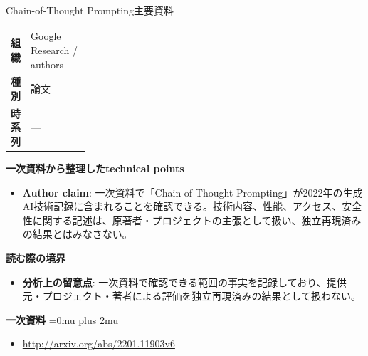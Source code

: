 \begin{technicalnote}{Chain-of-Thought Prompting}{主要資料}
\begingroup
\begin{tabularx}{\linewidth}{@{}>{\bfseries}p{0.22\linewidth}X@{}}
組織 & Google Research / authors \\
種別 & 論文 \\
時系列 & — \\
\end{tabularx}
\smallskip
{\bfseries 一次資料から整理したtechnical points}
\begin{itemize}[leftmargin=1.5em,itemsep=0.35em]
\item \textbf{Author claim}: 一次資料で「Chain-of-Thought Prompting」が2022年の生成AI技術記録に含まれることを確認できる。技術内容、性能、アクセス、安全性に関する記述は、原著者・プロジェクトの主張として扱い、独立再現済みの結果とはみなさない。
\end{itemize}
\begin{minipage}{\linewidth}
{\bfseries 読む際の境界}
\begin{itemize}[leftmargin=1.5em,itemsep=0.35em]
\item \textbf{分析上の留意点}: 一次資料で確認できる範囲の事実を記録しており、提供元・プロジェクト・著者による評価を独立再現済みの結果として扱わない。
\end{itemize}
\begin{samepage}
{\bfseries 一次資料}
\begingroup\sloppy
\Urlmuskip=0mu plus 2mu\relax
\begin{itemize}[leftmargin=1.5em,itemsep=0.25em]
\item {\scriptsize\url{http://arxiv.org/abs/2201.11903v6}}
\end{itemize}
\endgroup
\end{samepage}
\end{minipage}
\endgroup
\end{technicalnote}
\medskip

